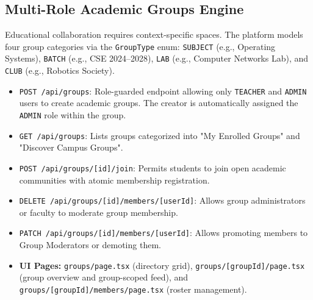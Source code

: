 \documentclass[12pt, a4paper, oneside]{report}
\begin{document}
\subsection{Multi-Role Academic Groups Engine}
Educational collaboration requires context-specific spaces. The platform models four group categories via the \texttt{GroupType} enum: \texttt{SUBJECT} (e.g., Operating Systems), \texttt{BATCH} (e.g., CSE 2024--2028), \texttt{LAB} (e.g., Computer Networks Lab), and \texttt{CLUB} (e.g., Robotics Society).
\begin{itemize}[leftmargin=0.7cm]
    \item \texttt{POST /api/groups}: Role-guarded endpoint allowing only \texttt{TEACHER} and \texttt{ADMIN} users to create academic groups. The creator is automatically assigned the \texttt{ADMIN} role within the group.
    \item \texttt{GET /api/groups}: Lists groups categorized into "My Enrolled Groups" and "Discover Campus Groups".
    \item \texttt{POST /api/groups/[id]/join}: Permits students to join open academic communities with atomic membership registration.
    \item \texttt{DELETE /api/groups/[id]/members/[userId]}: Allows group administrators or faculty to moderate group membership.
    \item \texttt{PATCH /api/groups/[id]/members/[userId]}: Allows promoting members to Group Moderators or demoting them.
    \item \textbf{UI Pages:} \texttt{groups/page.tsx} (directory grid), \texttt{groups/[groupId]/page.tsx} (group overview and group-scoped feed), and \texttt{groups/[groupId]/members/page.tsx} (roster management).
\end{itemize}
\end{document}
